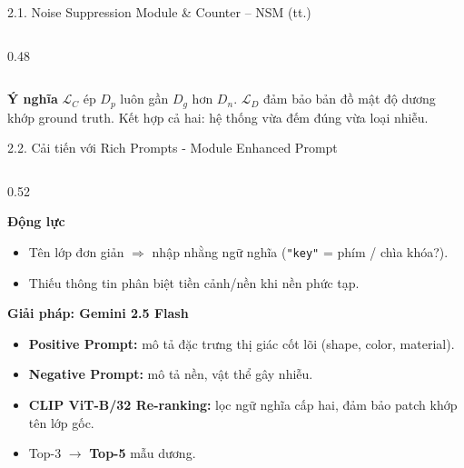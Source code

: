 \documentclass[11pt]{beamer}
\begin{document}
\begin{frame}[shrink=15]{2.1. Noise Suppression Module \& Counter -- NSM (tt.)}
\begin{columns}[T,onlytextwidth]
\begin{column}{0.48\textwidth}
\end{column}
\end{columns}

\vspace{0.3em}

\begin{block}{\textbf{Ý nghĩa}}
$\mathcal{L}_C$ ép $D_p$ luôn gần $D_g$ hơn $D_n$. $\mathcal{L}_D$ đảm bảo bản đồ mật độ dương khớp ground truth. Kết hợp cả hai: hệ thống vừa đếm đúng vừa loại nhiễu.
\end{block}

\end{frame}



\begin{frame}[fragile, shrink=15]{2.2. Cải tiến với Rich Prompts - Module Enhanced Prompt}
\scriptsize

\begin{columns}[T,onlytextwidth]
\begin{column}{0.52\textwidth}

\begin{block}{\textbf{Động lực}}
\begin{itemize}
  \item Tên lớp đơn giản $\Rightarrow$ nhập nhằng ngữ nghĩa (\texttt{"key"} = phím / chìa khóa?).
  \item Thiếu thông tin phân biệt tiền cảnh/nền khi nền phức tạp.
\end{itemize}
\end{block}

\begin{block}{\textbf{Giải pháp: Gemini 2.5 Flash}}
\begin{itemize}
  \item \textbf{Positive Prompt:} mô tả đặc trưng thị giác cốt lõi (shape, color, material).
  \item \textbf{Negative Prompt:} mô tả nền, vật thể gây nhiễu.
  \item \textbf{CLIP ViT-B/32 Re-ranking:} lọc ngữ nghĩa cấp hai, đảm bảo patch khớp tên lớp gốc.
  \item Top-3 $\to$ \textbf{Top-5} mẫu dương.
\end{itemize}
\end{block}


\end{column}
\end{columns}
\end{frame}
\end{document}
